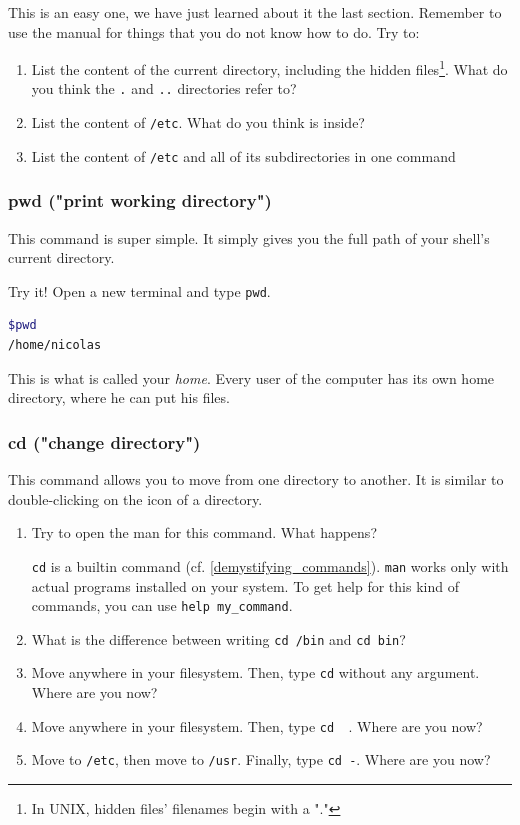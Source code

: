 \documentclass[12pt]{article}
\begin{document}
This is an easy one, we have just learned about it the last section. Remember to use the manual for things that you do not know how to do.
Try to:
\begin{enumerate}
\item List the content of the current directory, including the hidden files\footnote{In UNIX, hidden files' filenames begin with a "."}. What do you think the \texttt{.} and \texttt{..} directories refer to?
\item List the content of \texttt{/etc}. What do you think is inside?
\item List the content of \texttt{/etc} and all of its subdirectories in one command
\end{enumerate}

\subsubsection{pwd ("print working directory")}

This command is super simple. It simply gives you the full path of your shell's current directory.

Try it! Open a new terminal and type \texttt{pwd}.
\begin{lstlisting}[language=bash]
$pwd
/home/nicolas
\end{lstlisting}
This is what is called your \textit{home}. Every user of the computer has its own home directory, where he can put his files.

\subsubsection{cd ("change directory")}

This command allows you to move from one directory to another. It is similar to double-clicking on the icon of a directory.


\begin{enumerate}
\item Try to open the man for this command. What happens?

\texttt{cd} is a builtin command (cf. \ref{demystifying_commands}). \texttt{man} works only with actual programs installed on your system. To get help for this kind of commands,
you can use \texttt{help my\_command}.
\item What is the difference between writing \texttt{cd /bin} and \texttt{cd bin}?
\item Move anywhere in your filesystem. Then, type \texttt{cd} without any argument. Where are you now?
\item Move anywhere in your filesystem. Then, type \texttt{cd ~}. Where are you now?
\item Move to \texttt{/etc}, then move to \texttt{/usr}. Finally, type \texttt{cd -}. Where are you now?
\end{enumerate}
\end{document}
